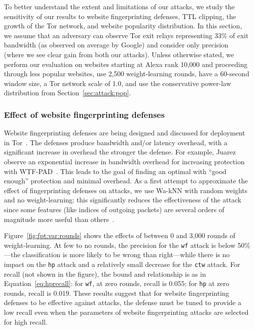 To better understand the extent and limitations of our attacks, we
study the sensitivity of our results to website fingerprinting defenses,
TTL clipping, the growth of the Tor network, and website popularity
distribution.  In this section, we assume that an adversary can observe Tor
exit relays representing 33\% of exit bandwidth (as observed on average
by Google) and consider only precision (where we see clear gain from both our
attacks).  Unless otherwise stated, we perform our evaluation on
websites starting at Alexa rank 10,000 and proceeding through less
popular websites, use 2,500 weight-learning rounds, have a 60-second window
size, a Tor network scale of 1.0, and use the conservative power-law
distribution from Section~\ref{sec:attack:pop}.



\subsubsection{Effect of website fingerprinting defenses}

Website fingerprinting defenses are being
designed and discussed for deployment in Tor~\cite{adapativepadding}.
The defenses produce bandwidth and/or latency overhead, with a significant
increase in overhead the stronger the defense. For example, Juarez \ea
observe an exponential increase in bandwidth overhead for increasing protection
with WTF-PAD~\cite{Juarez2016a}.
This leads to the goal of finding an optimal with ``good enough''
protection and minimal overhead.
As a first attempt to approximate the effect of fingerprinting
defenses on \name attacks, we use Wa-kNN with
random weights and no weight-learning: this significantly reduces the
effectiveness of the attack since some features (like indices of outgoing
packets) are several orders of magnitude more useful
than others~\cite{Juarez2016a}.

Figure~\ref{fig:fpt:var:rounds} shows the effects of between 0 and 3,000
rounds of weight-learning. At few to no rounds, the precision for the
\texttt{wf} attack is below 50\%---the classification is more likely to be wrong
than right---while there is no impact on the \texttt{hp} attack and a relatively
small decrease for the \texttt{ctw} attack.
For recall (not shown in the figure), the bound and relationship is
as in Equation~\ref{eq:hprecall}: for \texttt{wf}, at zero rounds, recall is
0.055; for \texttt{hp} at zero rounds, recall is 0.019. These results suggest
that for website fingerprinting defenses to be effective against \name attacks,
the defense must be tuned to provide a low recall even when the parameters of
website fingerprinting attacks are selected for high recall.

